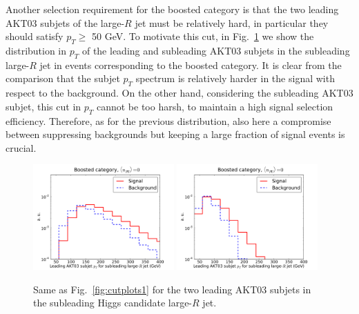 Another selection requirement for the boosted category is that the two
leading AKT03 subjets of the large-$R$ jet must be relatively hard,
in particular they should satisfy $p_T \ge $ 50 GeV.
%
To motivate this cut, in Fig.~\ref{fig:cutplots22}
we show the distribution in $p_T$ of the leading
and subleading AKT03 subjets in the subleading large-$R$ jet in events
corresponding to the boosted category.
%
It is clear from the comparison that the subjet $p_T$ spectrum is
relatively harder in the signal with respect to the background.
%
On the other hand, considering the subleading AKT03 subjet,
this cut in $p_T$
cannot be too harsh, to maintain a high signal selection
efficiency.
%
Therefore,
as for the previous distribution, also here 
a compromise between suppressing backgrounds but keeping a large fraction of
signal events is crucial.


\begin{figure}[t]
\begin{center}
 \includegraphics[width=0.48\textwidth]{plots/pt_leadSJ_fj2_noPU.pdf}
 \includegraphics[width=0.48\textwidth]{plots/pt_subleadSJ_fj2_noPU.pdf}
 \caption{\small  Same as Fig.~\ref{fig:cutplots1} for the two leading AKT03
   subjets in the subleading Higgs candidate large-$R$ jet.
}
\label{fig:cutplots22}
\end{center}
\end{figure}


